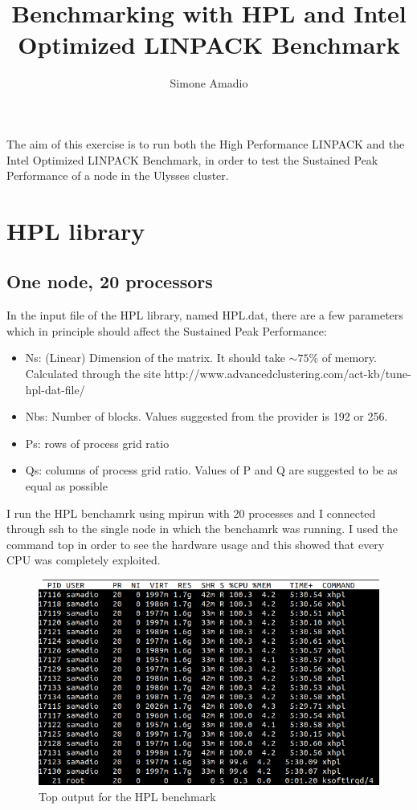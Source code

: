 \documentclass[10pt,a4paper]{article}
\begin{document}
\author{Simone Amadio}
\title{Benchmarking with HPL and Intel Optimized LINPACK Benchmark}	
\date{} 
\maketitle

The aim of this exercise is to run both the High Performance LINPACK and the Intel Optimized LINPACK Benchmark, in order to test the Sustained Peak Performance of a node in the Ulysses cluster.

\section{HPL library}

\subsection{One node, 20 processors}

In the input file of the HPL library,  named HPL.dat, there are a few parameters which in principle should affect the Sustained Peak Performance:

\begin{itemize}
\item Ns: (Linear) Dimension of the matrix. It should take $\sim 75\%$ of memory. Calculated through the site  http://www.advancedclustering.com/act-kb/tune-hpl-dat-file/
\item Nbs: Number of blocks. Values suggested from the provider is 192 or 256.
\item Ps: rows of process grid ratio
\item Qs: columns of process grid ratio. Values of P and Q are suggested to be as equal as possible
\end{itemize}

I run the HPL benchamrk using mpirun with 20 processes and I connected through ssh to the single node in which the benchamrk was running. I used the command top in order to see the hardware usage and this showed that every CPU was completely exploited.

\begin{figure}[h!]
	\centering
	\includegraphics[width=0.7\linewidth]{../usage}
	\caption*{Top output for the HPL benchmark}
	\label{fig:usage}
\end{figure}
\end{document}
